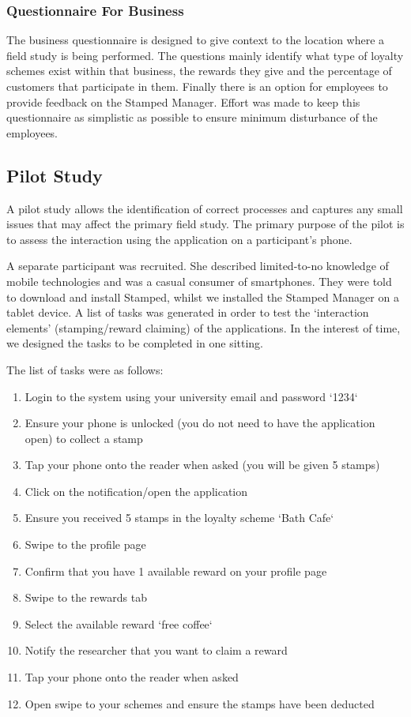 \subsubsection{Questionnaire For Business}
The business questionnaire is designed to give context to the location where a field study is being performed. The questions mainly identify what type of loyalty schemes exist within that business, the rewards they give and the percentage of customers that participate in them. Finally there is an option for employees to provide feedback on the Stamped Manager. Effort was made to keep this questionnaire as simplistic as possible to ensure minimum disturbance of the employees.

\subsection{Pilot Study}
A pilot study allows the identification of correct processes and captures any small issues that may affect the primary field study. The primary purpose of the pilot is to assess the interaction using the application on a participant's phone.

A separate participant was recruited. She described limited-to-no knowledge of mobile technologies and was a casual consumer of smartphones. They were told to download and install Stamped, whilst we installed the Stamped Manager on a tablet device. A list of tasks was generated in order to test the `interaction elements' (stamping/reward claiming) of the applications. In the interest of time, we designed the tasks to be completed in one sitting.

The list of tasks were as follows:

\begin{enumerate}
  \item Login to the system using your university email and password `1234`
  \item Ensure your phone is unlocked (you do not need to have the application open) to collect a stamp
  \item Tap your phone onto the reader when asked (you will be given 5 stamps)
  \item Click on the notification/open the application
  \item Ensure you received 5 stamps in the loyalty scheme `Bath Cafe`
  \item Swipe to the profile page
  \item Confirm that you have 1 available reward on your profile page
  \item Swipe to the rewards tab
  \item Select the available reward `free coffee`
  \item Notify the researcher that you want to claim a reward
  \item Tap your phone onto the reader when asked
  \item Open swipe to your schemes and ensure the stamps have been deducted
\end{enumerate}

